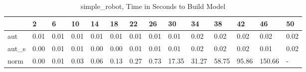 \begin{table}
\caption{simple_robot, Time in Seconds to Build Model}
\label{simple_robot_model_time}
\begin{tabular}{llllllllllllll}
\toprule
 & 2 & 6 & 10 & 14 & 18 & 22 & 26 & 30 & 34 & 38 & 42 & 46 & 50 \\
\midrule
aut & 0.01 & 0.01 & 0.01 & 0.01 & 0.01 & 0.01 & 0.01 & 0.01 & 0.02 & 0.02 & 0.02 & 0.02 & 0.02 \\
aut_s & 0.00 & 0.01 & 0.01 & 0.00 & 0.00 & 0.01 & 0.01 & 0.01 & 0.02 & 0.02 & 0.02 & 0.01 & 0.02 \\
norm & 0.00 & 0.01 & 0.03 & 0.06 & 0.13 & 0.27 & 0.73 & 17.35 & 31.27 & 58.75 & 95.86 & 150.66 & - \\
\bottomrule
\end{tabular}
\end{table}
